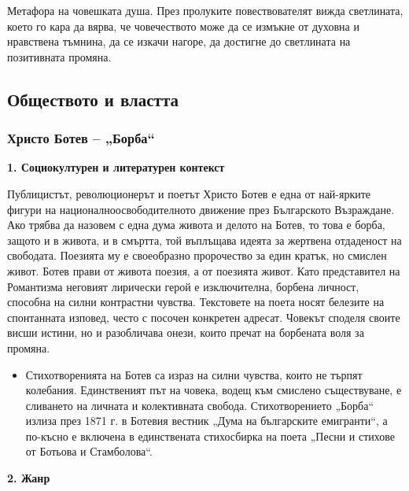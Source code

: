 \documentclass[12pt,a4paper]{article}
\begin{document}
\begin{itemize}
    \hspace*{0.5cm} Метафора на човешката душа. През пролуките повествователят вижда светлината, което го кара да вярва, че човечеството може да се измъкне от духовна и нравствена тъмнина, да се изкачи нагоре, да достигне до светлината на позитивната промяна.
\end{itemize}
\vspace{0.1cm}
\newpage

\subsection{Обществото и властта}
\subsubsection{\colorbox{green!40}{Христо Ботев – „Борба“}}
\textbf{1. Социокултурен и литературен контекст}
\vspace{0.1cm}

\indent Публицистът, революционерът и поетът Христо Ботев е една от най-ярките фигури на националноосвободителното движение през Българското Възраждане. Ако трябва да назовем с една дума живота и делото на Ботев, то това е борба, защото и в живота, и в смъртта, той въплъщава идеята за жертвена отдаденост на свободата. Поезията му е своеобразно пророчество за един кратък, но смислен живот. Ботев прави от живота поезия, а от поезията живот. Като представител на Романтизма неговият лирически герой е изключителна, борбена личност, способна на силни контрастни чувства. Текстовете на поета носят белезите на спонтанната изповед, често с посочен конкретен адресат. Човекът споделя своите висши истини, но и разобличава онези, които пречат на борбената воля за промяна.

\vspace{0.1cm}

\begin{itemize}[leftmargin=*]
\vspace{-0.45cm}
\item Стихотворенията на Ботев са израз на силни чувства, които не търпят колебания. Единственият път на човека, водещ към смислено съществуване, е сливането на личната и колективната свобода. Стихотворението „Борба“ излиза през 1871 г. в Ботевия вестник „Дума на българските емигранти“, а по-късно е включена в единствената стихосбирка на поета „Песни и стихове от Ботьова и Стамболова“.
\end{itemize}

\textbf{2. Жанр}
\vspace{0.1cm}
 
\end{document}
